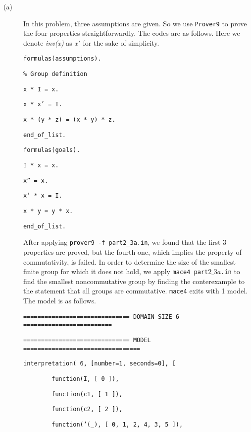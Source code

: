 \begin{description}
  \item[(a)] In this problem, three assumptions are given. So we use {\tt Prover9} to prove the four properties straightforwardly. The codes are as follows. Here we denote \emph{inv(x)} as $x'$ for the sake of simplicity.

\vspace{3mm}

{\footnotesize

{\tt formulas(assumptions).}

{\tt \% Group definition}

{\tt x * I = x.}

{\tt x * x' = I.}

{\tt x * (y * z) = (x * y) * z.}

{\tt end\_of\_list.}

{\tt formulas(goals).}

{\tt I * x = x.}

{\tt x'' = x.}

{\tt x' * x = I.}

{\tt x * y = y * x.}

{\tt end\_of\_list.}

}

\vspace{2mm}

  After applying {\tt prover9 -f part2\_3a.in}, we found that the first 3 properties are proved, but the fourth one, which implies the property of commutativity, is failed. In order to determine the size of the smallest finite group for which it does not hold, we apply {\tt mace4 part$2\_3a$.in} to find the smallest noncommutative group by finding the conterexample to the statement that all groups are commutative. {\tt mace4} exits with 1 model. The model is as follows.

\vspace{3mm}

{\tt ============================== DOMAIN SIZE 6 =========================}

{\tt ============================== MODEL =================================}

{\tt interpretation( 6, [number=1, seconds=0], [}

{\tt \ \ \ \ \ \ \ \ function(I, [ 0 ]),}

{\tt \ \ \ \ \ \ \ \ function(c1, [ 1 ]),}

{\tt \ \ \ \ \ \ \ \ function(c2, [ 2 ]),}

{\tt \ \ \ \ \ \ \ \ function('(\_), [ 0, 1, 2, 4, 3, 5 ]),}


\end{description}

